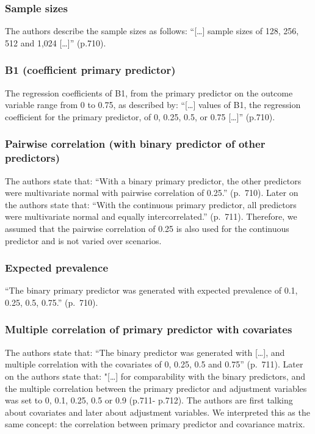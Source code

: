 \documentclass[10,a4paperpaper,]{article}
\begin{document}
\subsubsection{Sample sizes}

The authors describe the sample sizes as follows: ``{[}\ldots{]} sample
sizes of 128, 256, 512 and 1,024 {[}\ldots{]}'' (p.710).

\subsubsection{B1 (coefficient primary predictor)}

The regression coefficients of B1, from the primary predictor on the
outcome variable range from 0 to 0.75, as described by: ``{[}\ldots{]}
values of B1, the regression coefficient for the primary predictor, of
0, 0.25, 0.5, or 0.75 {[}\ldots{]}'' (p.710).

\subsubsection{Pairwise correlation (with binary predictor of other predictors)}

The authors state that: ``With a binary primary predictor, the other
predictors were multivariate normal with pairwise correlation of 0.25.''
(p.~710). Later on the authors state that: ``With the continuous primary
predictor, all predictors were multivariate normal and equally
intercorrelated.'' (p.~711). Therefore, we assumed that the pairwise
correlation of 0.25 is also used for the continuous predictor and is not
varied over scenarios.

\subsubsection{Expected prevalence}

``The binary primary predictor was generated with expected prevalence of
0.1, 0.25, 0.5, 0.75.'' (p.~710).

\subsubsection{Multiple correlation of primary predictor with covariates}

The authors state that: ``The binary predictor was generated with
{[}\ldots{]}, and multiple correlation with the covariates of 0, 0.25,
0.5 and 0.75'' (p.~711). Later on the authors state that: "{[}\ldots{]}
for comparability with the binary predictors, and the multiple
correlation between the primary predictor and adjustment variables was
set to 0, 0.1, 0.25, 0.5 or 0.9 (p.711- p.712). The authors are first
talking about covariates and later about adjustment variables. We
interpreted this as the same concept: the correlation between primary
predictor and covariance matrix.
\end{document}
